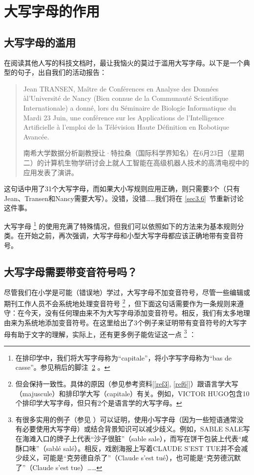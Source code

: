 \chapter{大写字母的作用}

\section{大写字母的滥用}\label{sec3.1}

在阅读其他人写的科技文档时，最让我恼火的莫过于滥用大写字母。以下是一个典型的句子，出自我们的活动报告：

\begin{quote}
    Jean TRANSEN, Maître de Conférences en Analyse des Données à\linebreak l'Université de Nancy (Bien connue de la Communauté Scientifique Internationale) a donné, lors du Séminaire de Biologie Informatique du Mardi 23 Juin, une conférence sur les Applications de l'Intelligence Artificielle à l'emploi de la Télévision Haute Définition en Robotique Avancée.

    \begin{bil}
        南希大学数据分析副教授让·特拉桑（国际科学界知名）在6月23日（星期二）的计算机生物学研讨会上就人工智能在高级机器人技术的高清电视中的应用发表了演讲。
    \end{bil}
\end{quote}
    
这句话中用了31个大写字母，而如果大小写规则应用正确，则只需要3个（只有Jean、Transen和Nancy需要大写）。没错，没错……我们将在 \ref{sec3.6}~节重新讨论这件事。

大写字母
    \footnote{在排印学中，我们将大写字母称为``capitale''，将小字写字母称为``bas de casse''。参见稍后的脚注~\ref{note15} 。}
的使用充满了特殊情况，但我们可以依照如下的方法来为基本规则分类。在开始之前，再次强调，大写字母和小型大写字母都应该正确地带有变音符号。

\section{大写字母需要带变音符号吗？}\label{sec3.2}

尽管我们在小学是可能（错误地）学过，大写字母不加变音符号，尽管一些编辑或期刊工作人员不会系统地处理变音符号
    \footnote{但会保持一致性。具体的原因（参见参考资料[\ref{ref3}, \ref{ref6}]）跟语言学大写（majuscule）和排印学大写（capitale）有关。例如，VICTOR HUGO包含10个排印学大写字母，但只有2个是语言学的大写字母。\label{note15}}
，但下面这句话需要作为一条规则来遵守：在今天，没有任何理由来不为大写字母添加变音符号。相反，我们有太多地理由来为系统地添加变音符号。在这里给出了3个例子来证明带有变音符号的大写字母有助于文字的理解，实际上，还有更多例子能佐证这一点
    \footnote{有很多实用的例子（参见  ）可以证明，使用小写字母（因为一些短语通常没有必要使用大写字母）或结合背景知识可以减少歧义。例如，SABLE SALE写在海滩入口的牌子上代表``沙子很脏''（sable sale），而写在饼干包装上代表``咸酥口味''（sablé salé）。相反，戏剧海报上写着CLAUDE S'EST TUE并不会减少歧义，可能是``克劳德自杀了''（Claude s'est tué），也可能是``克劳德沉默了''（Claude s'est tue）……}
：

